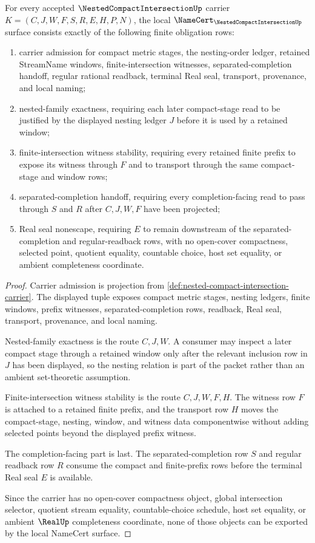 \begin{theorem}
\label{thm:nested-compact-intersection-namecert-obligations}
For every accepted $\NestedCompactIntersectionUp$ carrier $K=(C,J,W,F,S,R,E,H,P,N)$, the local $\NameCert_{\NestedCompactIntersectionUp}$ surface consists exactly of the following finite obligation rows:
\begin{enumerate}
\item carrier admission for compact metric stages, the nesting-order ledger, retained StreamName windows, finite-intersection witnesses, separated-completion handoff, regular rational readback, terminal Real seal, transport, provenance, and local naming;
\item nested-family exactness, requiring each later compact-stage read to be justified by the displayed nesting ledger $J$ before it is used by a retained window;
\item finite-intersection witness stability, requiring every retained finite prefix to expose its witness through $F$ and to transport through the same compact-stage and window rows;
\item separated-completion handoff, requiring every completion-facing read to pass through $S$ and $R$ after $C,J,W,F$ have been projected;
\item Real seal nonescape, requiring $E$ to remain downstream of the separated-completion and regular-readback rows, with no open-cover compactness, selected point, quotient equality, countable choice, host set equality, or ambient completeness coordinate.
\end{enumerate}
\end{theorem}
\begin{proof}
Carrier admission is projection from \autoref{def:nested-compact-intersection-carrier}. The displayed tuple exposes compact metric stages, nesting ledgers, finite windows, prefix witnesses, separated-completion rows, readback, Real seal, transport, provenance, and local naming.

Nested-family exactness is the route $C,J,W$. A consumer may inspect a later compact stage through a retained window only after the relevant inclusion row in $J$ has been displayed, so the nesting relation is part of the packet rather than an ambient set-theoretic assumption.

Finite-intersection witness stability is the route $C,J,W,F,H$. The witness row $F$ is attached to a retained finite prefix, and the transport row $H$ moves the compact-stage, nesting, window, and witness data componentwise without adding selected points beyond the displayed prefix witness.

The completion-facing part is last. The separated-completion row $S$ and regular readback row $R$ consume the compact and finite-prefix rows before the terminal Real seal $E$ is available.

Since the carrier has no open-cover compactness object, global intersection selector, quotient stream equality, countable-choice schedule, host set equality, or ambient $\RealUp$ completeness coordinate, none of those objects can be exported by the local NameCert surface.
\end{proof}

